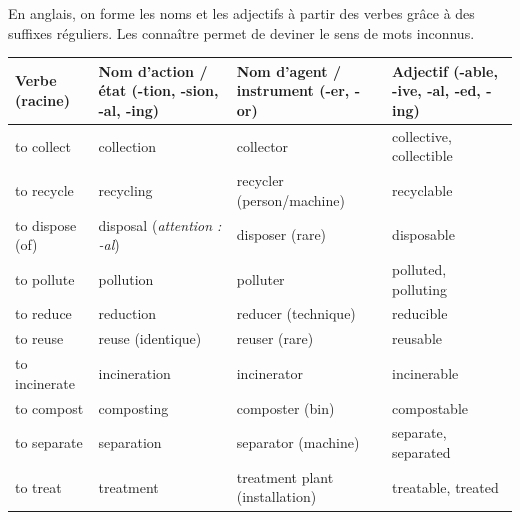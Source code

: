 \documentclass[11pt]{article}
\newcommand{\cle}[1]{{\popxbold\color{popdark}#1}}
\begin{document}
\begin{propriete}
En anglais, on forme les noms et les adjectifs à partir des verbes grâce à des suffixes réguliers. Les connaître permet de deviner le sens de mots inconnus.

\begin{center}
\begin{tabularx}{\linewidth}{|X|X|X|X|}
\hline
\rowcolor{popblueL} \textbf{Verbe (racine)} & \textbf{Nom d'action / état (-tion, -sion, -al, -ing)} & \textbf{Nom d'agent / instrument (-er, -or)} & \textbf{Adjectif (-able, -ive, -al, -ed, -ing)} \\
\hline
to \cle{collect} & \cle{collection} & \cle{collector} & \cle{collective}, \cle{collectible} \\
\hline
to \cle{recycle} & \cle{recycling} & \cle{recycler} (person/machine) & \cle{recyclable} \\
\hline
to \cle{dispose} (of) & \cle{disposal} (\emph{attention : -al}) & \cle{disposer} (rare) & \cle{disposable} \\
\hline
to \cle{pollute} & \cle{pollution} & \cle{polluter} & \cle{polluted}, \cle{polluting} \\
\hline
to \cle{reduce} & \cle{reduction} & \cle{reducer} (technique) & \cle{reducible} \\
\hline
to \cle{reuse} & \cle{reuse} (identique) & \cle{reuser} (rare) & \cle{reusable} \\
\hline
to \cle{incinerate} & \cle{incineration} & \cle{incinerator} & \cle{incinerable} \\
\hline
to \cle{compost} & \cle{composting} & \cle{composter} (bin) & \cle{compostable} \\
\hline
to \cle{separate} & \cle{separation} & \cle{separator} (machine) & \cle{separate}, \cle{separated} \\
\hline
to \cle{treat} & \cle{treatment} & \cle{treatment plant} (installation) & \cle{treatable}, \cle{treated} \\
\hline
\end{tabularx}
\end{center}


\end{propriete}
\end{document}
